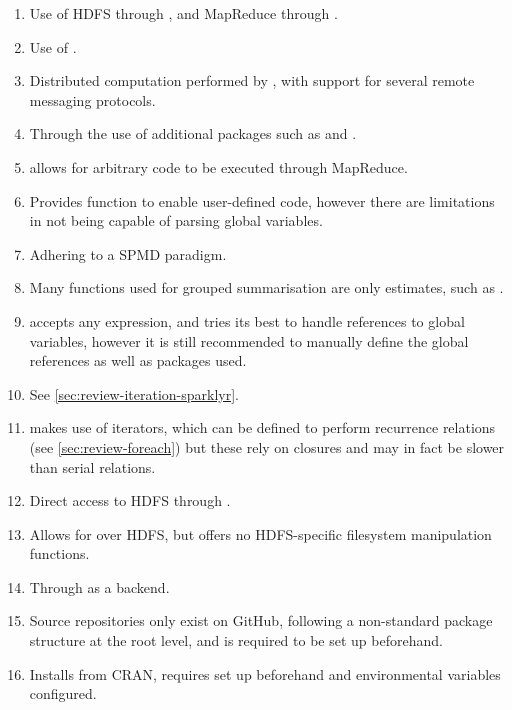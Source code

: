 \begin{enumerate}
\item\label{itm:x1} Use of HDFS through \cite{revo2013rhdfs}, and MapReduce through \cite{revo2014plyrmr}.
\item\label{itm:x2} Use of \cite{luraschi20}.
\item\label{itm:x3} Distributed computation performed by , with support for several remote messaging protocols\cites{Chen2012pbdMPIpackage,Schmidt2015pbdCSpackage}.
\item\label{itm:x4} Through the use of additional packages such as  and \cites{weston17,luraschi20}.
\item\label{itm:x5} \cite{revo2015rmr2} allows for arbitrary \R{} code to be executed through MapReduce.
\item\label{itm:x6}Provides  function to enable user-defined code, however there are limitations in not being capable of parsing global variables.
\item\label{itm:x7} Adhering to a SPMD paradigm.
\item\label{itm:x8} Many functions used for grouped summarisation are only estimates, such as \cite{zj19:_group_by}.
\item\label{itm:x9}  accepts any expression, and tries its best to handle references to global variables, however it is still recommended to manually define the global references as well as packages used.
\item\label{itm:x10} See \cref{sec:review-iteration-sparklyr}.
\item\label{itm:x11}  makes use of iterators, which can be defined to perform recurrence relations (see \cref{sec:review-foreach}) but these rely on closures and may in fact be slower than serial relations.
\item\label{itm:x12} Direct access to HDFS through \cite{revo2013rhdfs}.
\item\label{itm:x13} Allows for  over HDFS, but offers no HDFS-specific filesystem manipulation functions.
\item\label{itm:x14} Through  as a backend.
\item\label{itm:x15} Source repositories only exist on GitHub, following a non-standard package structure at the root level, and  is required to be set up beforehand.
\item\label{itm:x16} Installs from CRAN, requires  set up beforehand and environmental variables configured.

\end{enumerate}
